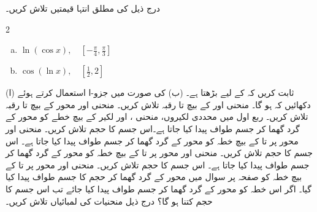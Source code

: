 درج ذیل کی  مطلق انتہا قیمتیں تلاش کریں۔
\begin{multicols}{2}
\begin{enumerate}[a.]
\item
$\ln(\cos x),\quad [-\tfrac{\pi}{4},\tfrac{\pi}{3}]$
\item
$\cos(\ln x),\quad [\tfrac{1}{2},2]$
\end{enumerate}
\end{multicols}
(ا) ثابت کریں کہ  کے لیے  بڑھتا ہے۔ (ب)  کی صورت میں جزو-ا استعمال کرتے ہوئے دکھائیں کہ  ہو گا۔
منحنی  اور  کے بیچ  تا  رقبہ تلاش کریں۔
منحنی  اور محور  کے بیچ  تا  رقبہ تلاش کریں۔
ربع اول میں محددی لکیروں، منحنی ،  اور لکیر  کے بیچ  خطے کو محور  کے گرد گھما کر جسم طواف پیدا کیا جاتا ہے۔اس جسم کا حجم تلاش کریں۔
منحنی  اور محور  پر  تا  کے بیچ خطہ کو محور  کے گرد گھما کر جسم طواف پیدا کیا جاتا ہے۔ اس جسم کا حجم تلاش کریں۔
منحنی  اور محور  پر  تا  کے بیچ خطہ کو محور  کے گرد گھما کر جسم طواف پیدا کیا جاتا ہے۔ اس جسم کا حجم تلاش کریں۔
منحنی  اور محور  پر  تا  کے بیچ خطہ  کو صفحہ  پر سوال   میں محور  کے گرد گھما کر  حجم کا جسم طواف پیدا کیا  گیا۔ اگر اس خطہ کو محور  کے گرد گھما کر جسم طواف پیدا کیا جائے تب اس جسم کا حجم کتنا ہو گا؟
درج ذیل منحنیات کی لمبائیاں  تلاش کریں۔
